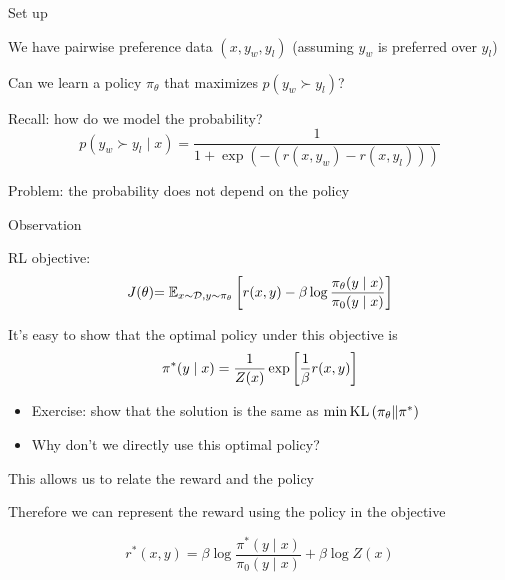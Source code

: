\documentclass[usenames,dvipsnames,notes,11pt,aspectratio=169,hyperref={colorlinks=true, linkcolor=blue}]{beamer}
\begin{document}
\begin{frame}
    {Set up}
    \begin{wideitemize}
        \item We have pairwise preference data $(x, y_w,  y_l)$ (assuming $y_w$ is preferred over $y_l$)
        \item Can we learn a policy $\pi_\theta$ that maximizes $p(y_w \succ y_l)$?
        \item Recall: how do we model the probability?
            $$
            p(y_w \succ y_l \mid x) = \frac{1}{1+\exp(-(r(x,y_w) - r(x,y_l)))}
            $$
        \item Problem: the probability does not depend on the policy
    \end{wideitemize}
\end{frame}

\begin{frame}
    {Observation}
    \begin{wideitemize}[<+->]
        \item RL objective: 
            \begin{align*}
                J(\theta) 
                {= \mathbb{E}_{x\sim\mathcal{D}, y\sim\pi_\theta}\left[ r(x,y) - \beta\log\frac{\pi_\theta(y\mid x)}{\pi_0(y\mid x)} \right] }
            \end{align*}
        \item It's easy to show that the optimal policy under this objective is
            $$
            \pi^*(y\mid x) = \frac{1}{Z(x)}\exp\left[ \frac{1}{\beta}r(x,y) \right]
            $$
            \begin{itemize}
                \item Exercise: show that the solution is the same as $\min \text{KL}\left( \pi_\theta \| \pi^* \right)$
                \item Why don't we directly use this optimal policy?
            \end{itemize}
        \item This allows us to relate the reward and the policy
        \item Therefore we can represent the reward using the policy in the objective
            \begin{mdframed}[linewidth=0pt, backgroundcolor=blue!20]
            $$
            r^*(x,y) = \beta\log\frac{\pi^*(y\mid x)}{\pi_0(y\mid x)} + \beta\log Z(x)
            $$
            \end{mdframed}
    \end{wideitemize}
\end{frame}
\end{document}
